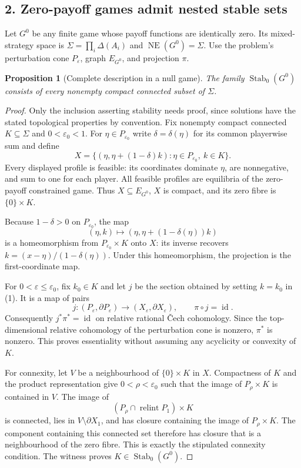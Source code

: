 \documentclass[11pt]{article}
\newcommand{\NE}{\operatorname{NE}}
\newcommand{\Stab}{\operatorname{Stab}_0}
\newcommand{\intr}{\operatorname{relint}}
\newtheorem{proposition}{Proposition}
\begin{document}
\subsection*{2. Zero-payoff games admit nested stable sets}
Let $G^0$ be any finite game whose payoff functions are identically zero. Its mixed-strategy space is $\Sigma=\prod_i\Delta(A_i)$ and $\NE(G^0)=\Sigma$. Use the problem's perturbation cone $P_\varepsilon$, graph $E_{G^0}$, and projection $\pi$.

\begin{proposition}[Complete description in a null game]
The family $\Stab(G^0)$ consists of every nonempty compact connected subset of $\Sigma$.
\end{proposition}
\begin{proof}
Only the inclusion asserting stability needs proof, since solutions have the stated topological properties by convention. Fix nonempty compact connected $K\subseteq\Sigma$ and $0<\varepsilon_0<1$. For $\eta\in P_{\varepsilon_0}$ write $\delta=\delta(\eta)$ for its common playerwise sum and define
\[
 X=\{(\eta,\eta+(1-\delta)k):
                 \eta\in P_{\varepsilon_0},\ k\in K\}.
                                                               \tag{1}
\]
Every displayed profile is feasible: its coordinates dominate $\eta$, are nonnegative, and sum to one for each player. All feasible profiles are equilibria of the zero-payoff constrained game. Thus $X\subseteq E_{G^0}$, $X$ is compact, and its zero fibre is $\{0\}\times K$.

Because $1-\delta>0$ on $P_{\varepsilon_0}$, the map
\[
 (\eta,k)\longmapsto(\eta,\eta+(1-\delta(\eta))k)
\]
is a homeomorphism from $P_{\varepsilon_0}\times K$ onto $X$: its inverse recovers $k=(x-\eta)/(1-\delta(\eta))$. Under this homeomorphism, the projection is the first-coordinate map.

For $0<\varepsilon\leq\varepsilon_0$, fix $k_0\in K$ and let $j$ be the section obtained by setting $k=k_0$ in (1). It is a map of pairs
\[
 j:(P_\varepsilon,\partial P_\varepsilon)
         \longrightarrow(X_\varepsilon,\partial X_\varepsilon),
 \qquad \pi\circ j=\operatorname{id}.
\]
Consequently $j^*\pi^*=\operatorname{id}$ on relative rational \v Cech cohomology. Since the top-dimensional relative cohomology of the perturbation cone is nonzero, $\pi^*$ is nonzero. This proves essentiality without assuming any acyclicity or convexity of $K$.

For connexity, let $V$ be a neighbourhood of $\{0\}\times K$ in $X$. Compactness of $K$ and the product representation give $0<\rho<\varepsilon_0$ such that the image of $P_\rho\times K$ is contained in $V$. The image of
\[
 (P_\rho\cap\intr P_1)\times K
\]
is connected, lies in $V\setminus\partial X_1$, and has closure containing the image of $P_\rho\times K$. The component containing this connected set therefore has closure that is a neighbourhood of the zero fibre. This is exactly the stipulated connexity condition. The witness proves $K\in\Stab(G^0)$.
\end{proof}
\end{document}
